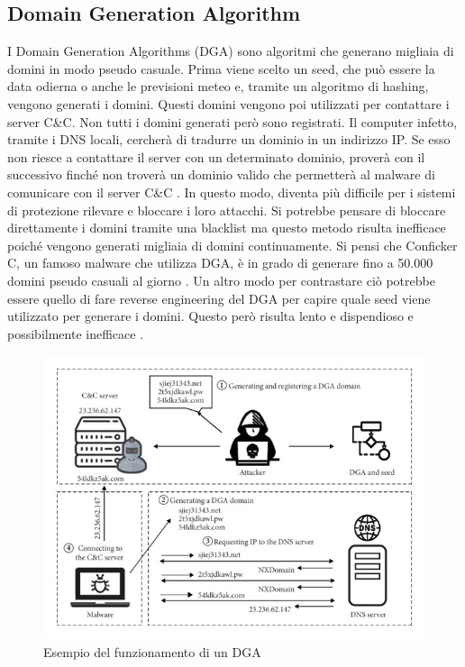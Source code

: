 \documentclass[12pt,a4paper,openright,twoside]{book}
\begin{document}
\subsection{Domain Generation Algorithm}

I Domain Generation Algorithms (DGA) sono algoritmi che generano migliaia di domini in modo pseudo casuale.
Prima viene scelto un seed, che può essere la data odierna
o anche le previsioni meteo \cite{8621875} e, tramite
un algoritmo di hashing, vengono generati i domini.
Questi domini vengono poi utilizzati per contattare i server C\&C.
Non tutti i domini generati però sono registrati.
Il computer infetto, tramite i DNS locali, cercherà di tradurre
un dominio in un indirizzo IP.
Se esso non riesce a contattare il server con un determinato dominio,
proverà con il successivo finché non troverà
un dominio valido che permetterà al malware di comunicare con
il server C\&C \cite{8489147}.
In questo modo, diventa più difficile per i sistemi di protezione
rilevare e bloccare i loro attacchi.
Si potrebbe pensare di bloccare direttamente i domini tramite
una blacklist ma questo metodo
risulta inefficace poiché vengono generati migliaia di domini
continuamente. Si pensi che Conficker C, un famoso malware
che utilizza DGA, è in grado di generare
fino a 50.000 domini pseudo casuali al giorno \cite{978131}.
Un altro modo per contrastare ciò
potrebbe essere quello di fare reverse engineering
del DGA per capire quale seed viene utilizzato per generare i domini.
Questo però risulta lento e dispendioso e possibilmente inefficace \cite{8887881}.

\begin{figure}[H]
    \centering
    \includegraphics[width=.8\linewidth]{figures/DGA example.jpg}
    \caption{Esempio del funzionamento di un DGA \cite{8887881}}
    \label{fig:DGA example}
\end{figure}
\end{document}

